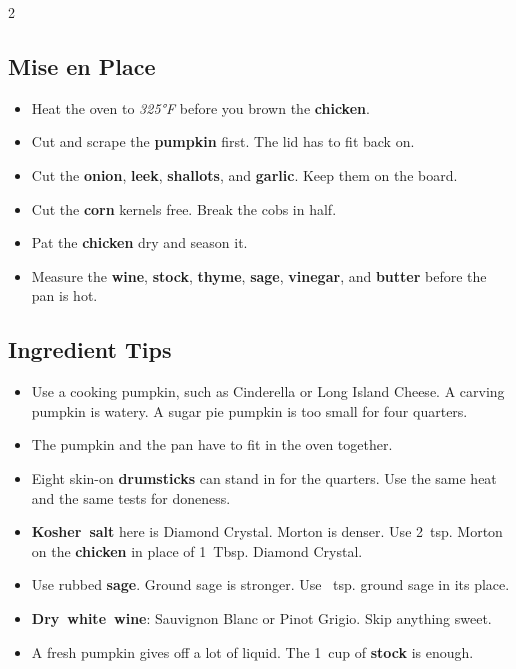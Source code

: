\documentclass[11pt,letterpaper]{article}
\begin{document}
{\begin{multicols}{2}
\subsection*{Mise en Place}
\begin{itemize}
    \item Heat the oven to \textit{325°F} before you brown the \textbf{chicken}.
    \item Cut and scrape the \textbf{pumpkin} first. The lid has to fit back on.
    \item Cut the \textbf{onion}, \textbf{leek}, \textbf{shallots}, and \textbf{garlic}. Keep them on the board.
    \item Cut the \textbf{corn} kernels free. Break the cobs in half.
    \item Pat the \textbf{chicken} dry and season it.
    \item Measure the \textbf{wine}, \textbf{stock}, \textbf{thyme}, \textbf{sage}, \textbf{vinegar}, and \textbf{butter} before the pan is hot.
\end{itemize}

\subsection*{Ingredient Tips}
\begin{itemize}
    \item Use a cooking pumpkin, such as Cinderella or Long Island Cheese. A carving pumpkin is watery. A sugar pie pumpkin is too small for four quarters.
    \item The pumpkin and the pan have to fit in the oven together.
    \item Eight skin-on \textbf{drumsticks} can stand in for the quarters. Use the same heat and the same tests for doneness.
    \item \textbf{Kosher~salt} here is Diamond Crystal. Morton is denser. Use 2~tsp. Morton on the \textbf{chicken} in place of 1~Tbsp. Diamond Crystal.
    \item Use rubbed \textbf{sage}. Ground sage is stronger. Use ~tsp. ground sage in its place.
    \item \textbf{Dry~white~wine}: Sauvignon Blanc or Pinot Grigio. Skip anything sweet.
    \item A fresh pumpkin gives off a lot of liquid. The 1~cup of \textbf{stock} is enough.
\end{itemize}


\end{multicols}}
\end{document}
